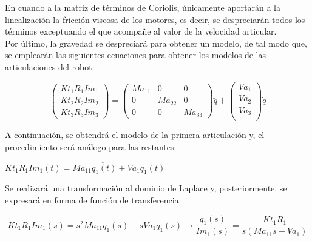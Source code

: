 En cuando a la matriz de términos de Coriolis, únicamente aportarán a la linealización la fricción viscosa de los motores, es decir, se despreciarán todos los términos exceptuando el que acompañe al valor de la velocidad articular.\\

Por último, la gravedad se despreciará para obtener un modelo, de tal modo que, se emplearán las siguientes ecuaciones para obtener los modelos de las articulaciones del robot:

\begin{equation}
\begin{pmatrix}

Kt_{1}R_{1}Im_{1}  \\

Kt_{2}R_{2}Im_{2}  \\

Kt_{3}R_{3}Im_{3}
\end{pmatrix} =
\begin{pmatrix}

Ma_{11} & 0 	  & 0  \\

0   & Ma_{22} & 0  \\

0   & 0   	  & Ma_{33}

\end{pmatrix}
\ddot{q}+
\begin{pmatrix}

Va_{1} \\

Va_{2} \\

Va_{3} \\

\end{pmatrix}
\dot{q}
\end{equation}



A continuación, se obtendrá el modelo de la primera articulación y, el procedimiento será análogo para las restantes:

\begin{center}
	
	$Kt_{1}R_{1}Im_{1}(t)=Ma_{11}\ddot{q_{1}(t)} + Va_{1}\dot{q_{1}(t)}$
	
\end{center}

Se realizará una transformación al dominio de Laplace y, posteriormente, se expresará en forma de función de transferencia:

\begin{equation}
Kt_{1}R_{1}Im_{1}(s)=s^{2}Ma_{11}q_{1}(s) + sVa_{1}q_{1}(s) \rightarrow \frac{q_{1}(s)}{Im_{1}(s)}=\frac{Kt_{1}R_{1}}{s(Ma_{11}s+Va_{1})}
\end{equation}




